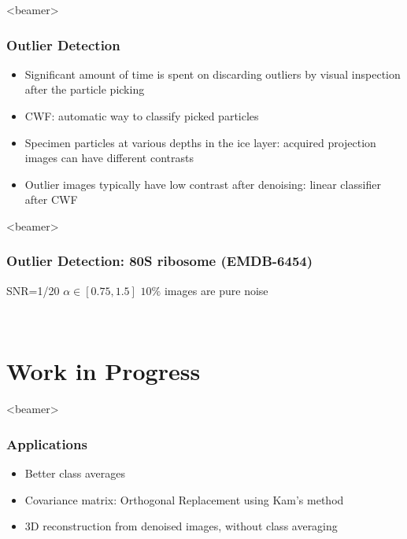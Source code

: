\documentclass{beamer}
\begin{document}
\begin{frame}<beamer>
\frametitle{Outlier Detection}
\begin{itemize}[<+->]
 \item  Significant amount of time is spent on discarding outliers by visual inspection
after the particle picking 
\item CWF:  automatic way to classify picked particles
\item Specimen particles at various depths in the ice layer: acquired
projection images can have different contrasts
\item  Outlier images typically have low contrast
after denoising: linear classifier
after CWF 
\end{itemize}
\end{frame}

\begin{frame}<beamer>
\frametitle{Outlier Detection: 80S ribosome (EMDB-6454)}
SNR=1/20 
$\alpha \in [0.75,1.5]$
$10\%$ images are pure noise
\begin{figure}[]
\centering
{}
\quad
{} \\
\quad
{}
\end{figure}
\end{frame}

\section{Work in Progress}
\begin{frame}<beamer>
\frametitle{Applications}
\begin{itemize}[<+->]
 \item Better class averages
 \item Covariance matrix: Orthogonal Replacement using Kam's method
 \item 3D reconstruction from denoised images, without class averaging
\end{itemize}
\end{frame}
\end{document}
